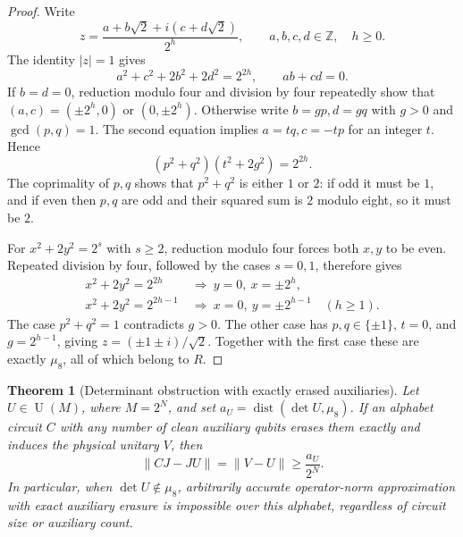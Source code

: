 \documentclass[11pt]{article}
\newtheorem{theorem}{Theorem}
\begin{document}
\begin{proof}
Write
\begin{equation}
 z=\frac{a+b\sqrt2+i(c+d\sqrt2)}{2^h},\qquad a,b,c,d\in\mathbb Z,
 \quad h\geq0.
\end{equation}
The identity $|z|=1$ gives
\begin{equation}\label{eq:finite-gate-ring-diophantine}
 a^2+c^2+2b^2+2d^2=2^{2h},\qquad ab+cd=0.
\end{equation}
If $b=d=0$, reduction modulo four and division by four repeatedly show that
$(a,c)=(\pm2^h,0)$ or $(0,\pm2^h)$.
Otherwise write $b=gp,d=gq$ with $g>0$ and $\gcd(p,q)=1$.
The second equation implies $a=tq,c=-tp$ for an integer $t$. Hence
\begin{equation}
 (p^2+q^2)(t^2+2g^2)=2^{2h}.
\end{equation}
The coprimality of $p,q$ shows that $p^2+q^2$ is either $1$ or $2$:
if odd it must be $1$, and if even then $p,q$ are odd and their squared sum
is $2$ modulo eight, so it must be $2$.

For $x^2+2y^2=2^s$ with $s\geq2$, reduction modulo four forces both $x,y$
to be even. Repeated division by four, followed by the cases $s=0,1$,
therefore gives
\begin{align}
 x^2+2y^2=2^{2h}&\ \Longrightarrow\ y=0,\ x=\pm2^h,\\
 x^2+2y^2=2^{2h-1}&\ \Longrightarrow\ x=0,\ y=\pm2^{h-1}
 \quad(h\geq1).
\end{align}
The case $p^2+q^2=1$ contradicts $g>0$.
The other case has $p,q\in\{\pm1\}$, $t=0$, and $g=2^{h-1}$,
giving $z=(\pm1\pm i)/\sqrt2$. Together with the first case these are
exactly $\mu_8$, all of which belong to $R$.
\end{proof}

\newpage
\begin{theorem}[Determinant obstruction with exactly erased auxiliaries]
\label{thm:finite-gate-clean-obstruction}
Let $U\in\operatorname{U}(M)$, where $M=2^N$, and set
$a_U=\operatorname{dist}(\det U,\mu_8)$. If an alphabet circuit $C$ with
any number of clean auxiliary qubits erases them exactly and induces the
physical unitary $V$, then
\begin{equation}\label{eq:finite-gate-clean-lower-bound}
 \|CJ-JU\|=\|V-U\|\geq\frac{a_U}{2^N}.
\end{equation}
In particular, when $\det U\notin\mu_8$, arbitrarily accurate
operator-norm approximation with exact auxiliary erasure is impossible
over this alphabet, regardless of circuit size or auxiliary count.
\end{theorem}
\end{document}
